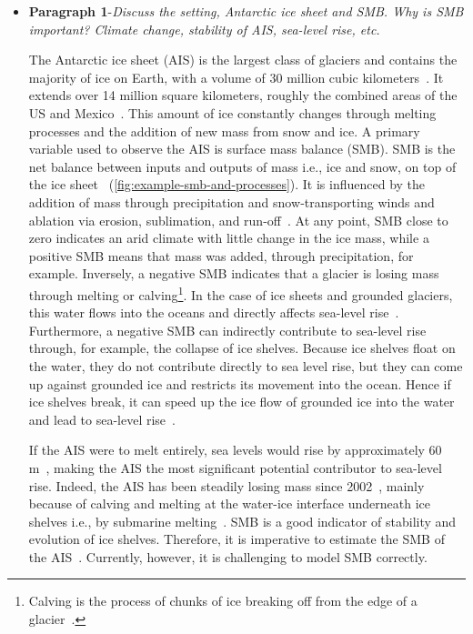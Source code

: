 \documentclass[a4paper,11pt,oneside]{report}
\begin{document}
\begin{itemize}
    \item \textbf{Paragraph 1}-\textit{Discuss the setting, Antarctic ice sheet and SMB. Why is SMB important? Climate change, stability of AIS, sea-level rise, etc.}
    
    The Antarctic ice sheet (AIS) is the largest class of glaciers and contains the majority of ice on Earth, with a volume of 30 million cubic kilometers~\cite{Icesheetsquick}. It extends over 14 million square kilometers, roughly the combined areas of the US and Mexico~\cite{AntarcticIceSheet}. This amount of ice constantly changes through melting processes and the addition of new mass from snow and ice. A primary variable used to observe the AIS is surface mass balance (SMB). SMB is the net balance between inputs and outputs of mass i.e., ice and snow, on top of the ice sheet~\cite{Lenaerts2019} (\autoref{fig:example-smb-and-processes}). It is influenced by the addition of mass through precipitation and snow‐transporting winds and ablation via erosion, sublimation, and run-off~\cite{Kittel}. At any point, SMB close to zero indicates an arid climate with little change in the ice mass, while a positive SMB means that mass was added, through precipitation, for example. Inversely, a negative SMB indicates that a glacier is losing mass through melting or calving\footnote{Calving is the process of chunks of ice breaking off from the edge of a glacier~\cite{Marshak}.}. In the case of ice sheets and grounded glaciers, this water flows into the oceans and directly affects sea-level rise~\cite{icesheet}. Furthermore, a negative SMB can indirectly contribute to sea-level rise through, for example, the collapse of ice shelves. Because ice shelves float on the water, they do not contribute directly to sea level rise, but they can come up against grounded ice and restricts its movement into the ocean. Hence if ice shelves break, it can speed up the ice flow of grounded ice into the water and lead to sea-level rise~\cite{Hartley2020, iceshelvescollapse}.  
        
    If the AIS were to melt entirely, sea levels would rise by approximately 60 \si{m}~\cite{Kittel, Fretwell, Morlighem}, making the AIS the most significant potential contributor to sea-level rise. Indeed, the AIS has been steadily losing mass since 2002~\cite{Shepherd, Mottram}, mainly because of calving and melting at the water-ice interface underneath ice shelves i.e., by submarine melting~\cite{Kittel, Mottram, Rignot}. SMB is a good indicator of stability and evolution of ice shelves. Therefore, it is imperative to estimate the SMB of the AIS~\cite{icesheet}. Currently, however, it is challenging to model SMB correctly.  


\end{itemize}
\end{document}
